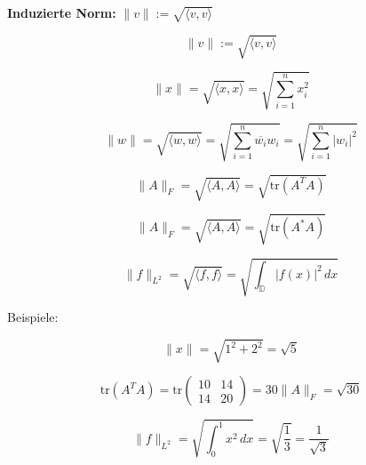\documentclass[9pt,a4paper]{article}
\begin{document}
    \textbf{Induzierte Norm:}  
    $\|v\| := \sqrt{\langle v, v \rangle} $ \\
    
    
    $$\|v\| := \sqrt{\langle v, v \rangle}$$
    
    $$\|x\| = \sqrt{\langle x, x \rangle} = \sqrt{\sum_{i=1}^{n} x_i^2}$$
    
    $$\|w\| = \sqrt{\langle w, w \rangle} = \sqrt{\sum_{i=1}^{n} \overline{w_i} w_i} = \sqrt{\sum_{i=1}^{n} |w_i|^2}$$
    
    $$\|A\|_F = \sqrt{\langle A, A \rangle} = \sqrt{\text{tr}(A^T A)}$$
    
    $$\|A\|_F = \sqrt{\langle A, A \rangle} = \sqrt{\text{tr}(A^* A)}$$
    
    $$\|f\|_{L^2} = \sqrt{\langle f, f \rangle} = \sqrt{\int_{\mathbb{D}} |f(x)|^2 \, dx}$$
    
    Beispiele: 
    
    $$\|x\| = \sqrt{1^2 + 2^2} = \sqrt{5}$$
    
    $$\text{tr}(A^T A) = \text{tr}\begin{pmatrix} 10 & 14 \\ 14 & 20 \end{pmatrix} = 30
    \|A\|_F = \sqrt{30}$$
    
    $$\|f\|_{L^2} = \sqrt{\int_0^1 x^2 \, dx} = \sqrt{\frac{1}{3}} = \frac{1}{\sqrt{3}}$$
    
\end{document}
